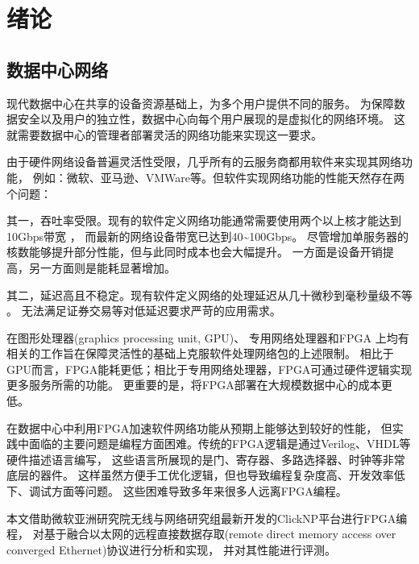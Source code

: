\chapter{绪论}
\section{数据中心网络}
现代数据中心在共享的设备资源基础上，为多个用户提供不同的服务。
为保障数据安全以及用户的独立性，数据中心向每个用户展现的是虚拟化的网络环境。
这就需要数据中心的管理者部署灵活的网络功能来实现这一要求。

由于硬件网络设备普遍灵活性受限，几乎所有的云服务商都用软件来实现其网络功能，
例如：微软、亚马逊、VMWare等\cite{azure, 179731}。但软件实现网络功能的性能天然存在两个问题：

其一，吞吐率受限。现有的软件定义网络功能通常需要使用两个以上核才能达到10Gbps带宽
\cite{Martins:2014:CAN:2616448.2616491,180672}，
而最新的网络设备带宽已达到40\textasciitilde 100Gbps\cite{edr}。
尽管增加单服务器的核数能够提升部分性能，但与此同时成本也会大幅提升。
一方面是设备开销提高，另一方面则是能耗显著增加。

其二，延迟高且不稳定。现有软件定义网络的处理延迟从几十微秒到毫秒量级不等
\cite{Gandhi:2014:DCS:2619239.2626317, Martins:2014:CAN:2616448.2616491, Patel:2013:ACS:2486001.2486026}。
无法满足证券交易等对低延迟要求严苛的应用需求。

在图形处理器(graphics processing unit, GPU)\cite{Han:2010:PGS:1851275.1851207}、
专用网络处理器\cite{cavium, netronome}和FPGA\cite{sigcomm2015keynote, Naous:2008:NRR:1397718.1397720}
上均有相关的工作旨在保障灵活性的基础上克服软件处理网络包的上述限制。
相比于GPU而言，FPGA能耗更低\cite{5681761, 5572788}；相比于专用网络处理器，FPGA可通过硬件逻辑实现更多服务所需的功能。
更重要的是，将FPGA部署在大规模数据中心的成本更低\cite{sigcomm2015keynote,6853195}。

在数据中心中利用FPGA加速软件网络功能从预期上能够达到较好的性能，
但实践中面临的主要问题是编程方面困难。传统的FPGA逻辑是通过Verilog、VHDL等硬件描述语言编写，
这些语言所展现的是门、寄存器、多路选择器、时钟等非常底层的器件。
这样虽然方便手工优化逻辑，但也导致编程复杂度高、开发效率低下、调试方面等问题。
这些困难导致多年来很多人远离FPGA编程\cite{Bacon:2013:FPM:2436256.2436271}。

本文借助微软亚洲研究院无线与网络研究组最新开发的ClickNP平台\cite{clicknp}进行FPGA编程，
对基于融合以太网的远程直接数据存取(remote direct memory access over converged Ethernet)协议进行分析和实现，
并对其性能进行评测。

